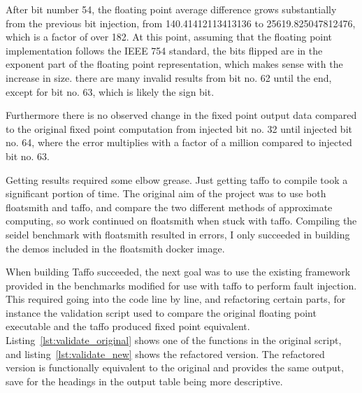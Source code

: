 After bit number 54, the floating point average difference grows substantially from the previous bit injection, from 140.41412113413136 to 25619.825047812476, which is a factor of over 182. At this point, assuming that the floating point implementation follows the IEEE 754 standard, the bits flipped are in the exponent part of the floating point representation, which makes sense with the increase in size. there are many invalid results from bit no. 62 until the end, except for bit no. 63, which is likely the sign bit.

Furthermore there is no observed change in the fixed point output data compared to the original fixed point computation from injected bit no. 32 until injected bit no. 64, where the error multiplies with a factor of a million compared to injected bit no. 63.


Getting results required some elbow grease. Just getting taffo to compile took a significant portion of time. The original aim of the project was to use both floatsmith and taffo, and compare the two different methods of approximate computing, so work continued on floatsmith when stuck with taffo. Compiling the seidel benchmark with floatsmith resulted in errors, I only succeeded in building the demos included in the floatsmith docker image. 

When building Taffo succeeded, the next goal was to use the existing framework provided in the benchmarks modified for use with taffo to perform fault injection. This required going into the code line by line, and refactoring certain parts, for instance the validation script used to compare the original floating point executable and the taffo produced fixed point equivalent. 
Listing~\ref{lst:validate_original} shows one of the functions in the original script, and listing~\ref{lst:validate_new} shows the refactored version. The refactored version is functionally equivalent to the original and provides the same output, save for the headings in the output table being more descriptive.




